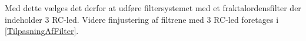 Med dette vælges det derfor at udføre filtersystemet med et fraktalordensfilter der indeholder 3 RC-led.
Videre finjustering af filtrene med 3 RC-led foretages i \autoref{TilpasningAfFilter}.












